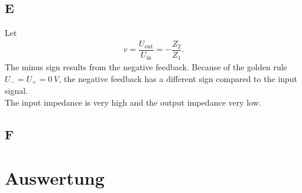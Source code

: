 \documentclass[a4paper,10pt]{article}
\numberwithin{equation}{section}
\begin{document}
\begin{multicols}{2}
        \subsection{E}
        Let
        \begin{align} 
                v=\dfrac{U_\text{out}}{U_\text{in}}=-\dfrac{Z_2}{Z_1}
        .\end{align} 
        The minus sign results from the negative feedback.
        Because of the golden rule $U_-=U_+=\SI{0}{V}$, the negative feedback has a different sign compared to the input signal.
        \\\indent The input impedance is very high and the output impedance very low. 

        \subsection{F}
        

        \newpage
        \section{Auswertung}
\end{multicols}

\clearpage
\listoffigures
\listoftables



\end{document}
